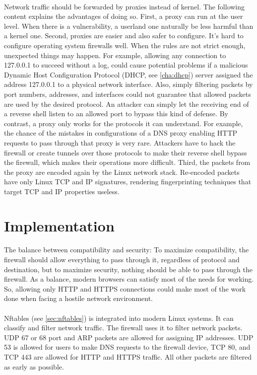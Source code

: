 \documentclass[mscthesis]{usiinfthesis}
\begin{document}
\paragraph{}
Network traffic should be forwarded by proxies instead of kernel. The following content explains the advantages of doing so. First, a proxy can run at the user level. When there is a vulnerability, a userland one naturally be less harmful than a kernel one. Second, proxies are easier and also safer to configure. It's hard to configure operating system firewalls well. When the rules are not strict enough, unexpected things may happen. For example, allowing any connection to 127.0.0.1 to succeed without a log, could cause potential problems if a malicious Dynamic Host Configuration Protocol (DHCP, see \cref{cha:dhcp}) server assigned the address 127.0.0.1 to a physical network interface. Also, simply filtering packets by port numbers, addresses, and interfaces could not guarantee that allowed packets are used by the desired protocol. An attacker can simply let the receiving end of a reverse shell listen to an allowed port to bypass this kind of defense. By contrast, a proxy only works for the protocols it can understand. For example, the chance of the mistakes in configurations of a DNS proxy enabling HTTP requests to pass through that proxy is very rare. Attackers have to hack the firewall or create tunnels over those protocols to make their reverse shell bypass the firewall, which makes their operations more difficult. Third, the packets from the proxy are encoded again by the Linux network stack. Re-encoded packets have only Linux TCP and IP signatures, rendering fingerprinting techniques that target TCP and IP properties useless.

\section{Implementation}
\paragraph{}
The balance between compatibility and security: To maximize compatibility, the firewall should allow everything to pass through it, regardless of protocol and destination, but to maximize security, nothing should be able to pass through the firewall. As a balance, modern browsers can satisfy most of the needs for working. So, allowing only HTTP and HTTPS connections could make most of the work done when facing a hostile network environment.
\paragraph{}
Nftables (see \cref{sec:nftables}) is integrated into modern Linux systems. It can classify and filter network traffic. The firewall uses it to filter network packets. UDP 67 or 68 port and ARP packets are allowed for assigning IP addresses. UDP 53 is allowed for users to make DNS requests to the firewall device, TCP 80, and TCP 443 are allowed for HTTP and HTTPS traffic. All other packets are filtered as early as possible.
\end{document}
